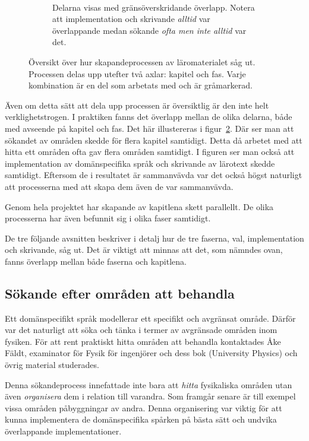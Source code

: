 \begin{draft}
\begin{figure}[tph]
\begin{subfigure}[t]{0.5\textwidth}
        \caption{Delarna visas med gränsöverskridande överlapp. Notera att
        implementation och skrivande \textit{alltid} var överlappande medan
      sökande \textit{ofta men inte alltid} var det.}~\label{fig:oversiktB}
    \end{subfigure}
    \caption{Översikt över hur skapandeprocessen av läromaterialet såg ut.
  Processen delas upp utefter två axlar: kapitel och fas. Varje kombination
  är en del som arbetats med och är gråmarkerad.} \end{figure}

Även om detta sätt att dela upp processen är översiktlig är den inte helt
verklighetstrogen. I praktiken fanns det överlapp mellan de olika delarna, både
med avseende på kapitel och fas. Det här illustereras i
figur~\ref{fig:oversiktB}. Där ser man att sökandet av områden skedde för flera
kapitel samtidigt. Detta då arbetet med att hitta ett områden ofta gav flera
områden samtidigt. I figuren ser man också att implementation av domänspecifika
språk och skrivande av lärotext skedde samtidigt. Eftersom de i resultatet är
sammanvävda var det också högst naturligt att processerna med att skapa dem
även de var sammanvävda.

Genom hela projektet har skapande av kapitlena skett parallellt. De olika processerna har även befunnit sig i olika faser samtidigt.

De tre följande avsnitten beskriver i detalj hur de tre faserna, val, implementation och skrivande, såg ut. Det är viktigt att minnas att det, som nämndes ovan, fanns överlapp mellan både faserna och kapitlena.

\subsection{Sökande efter områden att behandla}\label{sec:valet}

Ett domänspecifikt språk modellerar ett specifikt och avgränsat område. Därför var det naturligt att söka och tänka i termer av avgränsade områden inom fysiken. För att rent praktiskt hitta områden att behandla kontaktades Åke Fäldt, examinator för Fysik för ingenjörer\cite{tif085} och dess bok (University Physics\cite{UP}) och övrig material studerades.

Denna sökandeprocess innefattade inte bara att \textit{hitta} fysikaliska områden utan även \textit{organisera} dem i relation till varandra. Som framgår senare är till exempel vissa områden påbyggningar av andra. Denna organisering var viktig för att kunna implementera de domänspecifika spårken på bästa sätt och undvika överlappande implementationer.


\end{draft}
